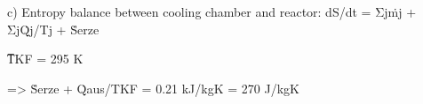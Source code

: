 c) Entropy balance between cooling chamber and reactor:  
dS/dt = Σjṁj + ΣjQ̇j/Tj + Ṡerze

T̅KF = 295 K

=> Ṡerze + Q̇aus/TKF = 0.21 kJ/kgK = 270 J/kgK